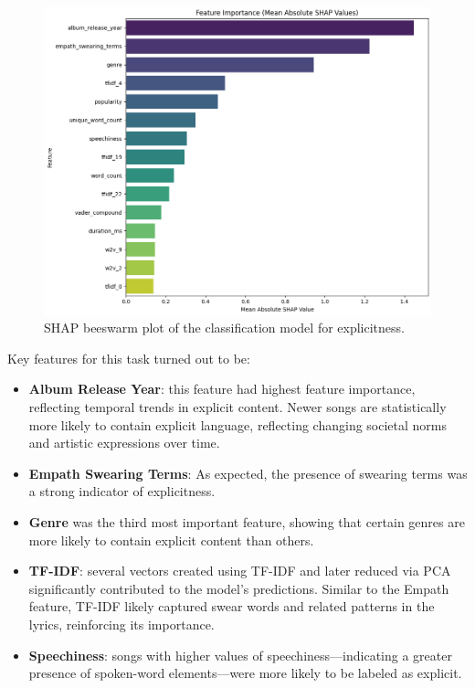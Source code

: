 \begin{center}
\begin{figure}[H]
  \centering
  \includegraphics[width=5in]{img/feature_importance_explicitness.png}
  \caption{SHAP beeswarm plot of the classification model for explicitness.}
  \label{Figure:fig_beh}
\end{figure}
\end{center}


Key features for this task turned out to be:
\begin{itemize}
  \item \textbf{Album Release Year}: this feature had  highest feature
    importance, reflecting temporal trends in explicit content. Newer songs are
    statistically more likely to contain explicit language, reflecting changing
    societal norms and artistic expressions over time.
  \item \textbf{Empath Swearing Terms}: As expected, the presence of swearing
    terms was a strong indicator of explicitness.
  \item \textbf{Genre} was the third most important feature, showing that
    certain genres  are more likely to contain explicit content than others.
  \item \textbf{TF-IDF}: several vectors created using TF-IDF and later reduced
    via PCA significantly contributed to the model's predictions. Similar to
    the Empath feature, TF-IDF likely captured swear words and related patterns
    in the lyrics, reinforcing its importance.
  \item \textbf{Speechiness}: songs with higher values of
    speechiness—indicating a greater presence of spoken-word elements—were more
    likely to be labeled as explicit.
\end{itemize}
